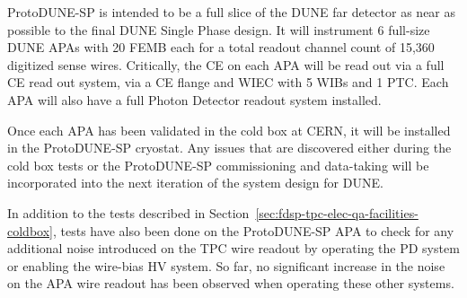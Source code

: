 ProtoDUNE-SP is intended to be a full slice of the DUNE far detector as near as possible to the final DUNE Single Phase design. It will instrument 6 full-size DUNE APAs with 20 FEMB each for a total readout channel count of 15,360 digitized sense wires. Critically, the CE on each APA will be read out via a full CE read out system, via a CE flange and WIEC with 5 WIBs and 1 PTC. Each APA will also have a full Photon Detector readout system installed.

Once each APA has been validated in the cold box at CERN, it will be installed in the ProtoDUNE-SP cryostat. Any issues that are discovered either during the cold box tests or the ProtoDUNE-SP commissioning and data-taking will be incorporated into the next iteration of the system design for DUNE.

In addition to the tests described in Section~\ref{sec:fdsp-tpc-elec-qa-facilities-coldbox}, tests have also been done on the ProtoDUNE-SP APA to check for any additional noise introduced on the TPC wire readout by operating the PD system or enabling the wire-bias HV system. So far, no significant increase in the noise on the APA wire readout has been observed when operating these other systems.
